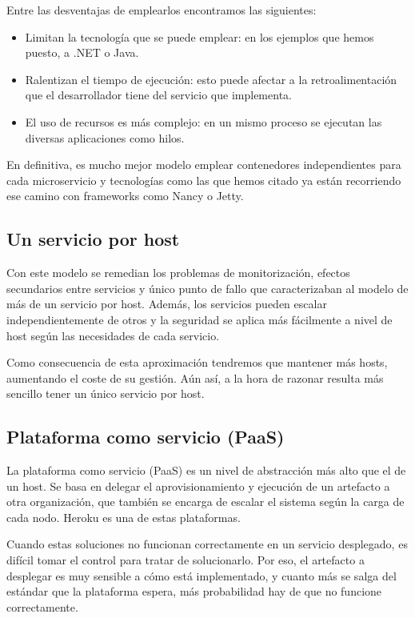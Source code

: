 \documentclass[11pt,a4paper]{article}
\begin{document}
Entre las desventajas de emplearlos encontramos las siguientes:

\begin{itemize}

\item Limitan la tecnología que se puede emplear: en los ejemplos que hemos puesto, a .NET o Java.

\item Ralentizan el tiempo de ejecución: esto puede afectar a la retroalimentación que el desarrollador tiene del servicio que implementa.

\item El uso de recursos es más complejo: en un mismo proceso se ejecutan las diversas aplicaciones como hilos.

\end{itemize}

En definitiva, es mucho mejor modelo emplear contenedores independientes para cada microservicio y tecnologías como las que hemos citado ya están recorriendo ese camino con frameworks como Nancy o Jetty.

\subsection{Un servicio por host}

Con este modelo se remedian los problemas de monitorización, efectos secundarios entre servicios y único punto de fallo que caracterizaban al modelo de más de un servicio por host. Además, los servicios pueden escalar independientemente de otros y la seguridad se aplica más fácilmente a nivel de host según las necesidades de cada servicio.

Como consecuencia de esta aproximación tendremos que mantener más hosts, aumentando el coste de su gestión. Aún así, a la hora de razonar resulta más sencillo tener un único servicio por host.

\subsection{Plataforma como servicio (PaaS)}

La plataforma como servicio (PaaS) es un nivel de abstracción más alto que el de un host. Se basa en delegar el aprovisionamiento y ejecución de un artefacto a otra organización, que también se encarga de escalar el sistema según la carga de cada nodo. Heroku es una de estas plataformas.

Cuando estas soluciones no funcionan correctamente en un servicio desplegado, es difícil tomar el control para tratar de solucionarlo. Por eso, el artefacto a desplegar es muy sensible a cómo está implementado, y cuanto más se salga del estándar que la plataforma espera, más probabilidad hay de que no funcione correctamente.
\end{document}
